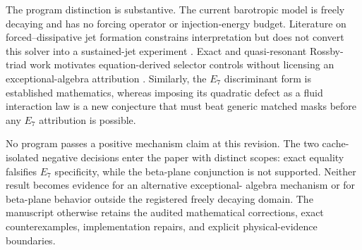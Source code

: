 The program distinction is substantive. The current barotropic model is
freely decaying and has no forcing operator or injection-energy budget.
Literature on forced--dissipative jet formation constrains interpretation but
does not convert this solver into a sustained-jet experiment
\cite{bakas2015s3t,bakas2019weakjets,sahoo2025interfaces}. Exact and
quasi-resonant Rossby-triad work motivates equation-derived selector controls
without licensing an exceptional-algebra attribution
\cite{kartashov2013rossby,hayat2018rossby}. Similarly, the
$E_7$ discriminant form is established mathematics, whereas imposing its
quadratic defect as a fluid interaction law is a new conjecture that must beat
generic matched masks before any $E_7$ attribution is possible.

No program passes a positive mechanism claim at this revision. The two
cache-isolated negative decisions enter the paper with distinct scopes: exact
equality falsifies $E_7$ specificity, while the beta-plane conjunction is not
supported. Neither result becomes evidence for an alternative exceptional-
algebra mechanism or for beta-plane behavior outside the registered freely
decaying domain. The manuscript otherwise retains the audited mathematical
corrections, exact counterexamples, implementation repairs, and explicit
physical-evidence boundaries.

